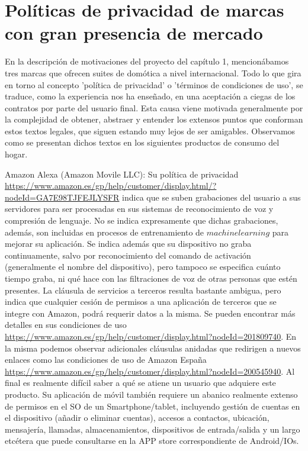 \vspace{1.5cm}


\section{Políticas de privacidad de marcas con gran presencia de mercado}
\label{ch:Capitulo2.1}

En la descripción de motivaciones del proyecto del capítulo 1, mencionábamos tres marcas que ofrecen suites de domótica a nivel internacional. Todo lo que gira en torno al concepto 'política de privacidad' o 'términos de condiciones de uso', se traduce, como la experiencia nos ha enseñado, en una aceptación a ciegas de los contratos por parte del usuario final. Esta causa viene motivada generalmente por la complejidad de obtener, abstraer y entender los extensos puntos que conforman estos textos legales, que siguen estando muy lejos de ser amigables. Observamos como se presentan dichos textos en los siguientes productos de consumo del hogar.

\vspace{1.5cm}

Amazon Alexa (Amazon Movile LLC): Su política de privacidad \url{https://www.amazon.es/gp/help/customer/display.html/?nodeId=GA7E98TJFEJLYSFR} indica que se suben grabaciones del usuario a sus servidores para ser procesadas en sus sistemas de reconocimiento de voz y compresión de lenguaje. No se indica expresamente que dichas grabaciones, además, son incluidas en procesos de entrenamiento de $machine learning$ para mejorar su aplicación. Se indica además que su dispositivo no graba continuamente, salvo por reconocimiento del comando de activación (generalmente el nombre del dispositivo), pero tampoco se especifica cuánto tiempo graba, ni qué hace con las filtraciones de voz de otras personas que estén presentes. La cláusula de servicios a terceros resulta bastante ambigua, pero indica que cualquier cesión de permisos a una aplicación de terceros que se integre con Amazon, podrá requerir datos a la misma. Se pueden encontrar más detalles en sus condiciones de uso \url{https://www.amazon.es/gp/help/customer/display.html?nodeId=201809740}. En la misma podemos observar adicionales cláusulas anidadas que redirigen a nuevos enlaces como las condiciones de uso de Amazon España \url{https://www.amazon.es/gp/help/customer/display.html?nodeId=200545940}. Al final es realmente difícil saber a qué se atiene un usuario que adquiere este producto. Su aplicación de móvil también requiere un abanico realmente extenso de permisos en el SO de un Smartphone/tablet, incluyendo gestión de cuentas en el dispositivo (añadir o eliminar cuentas), accesos a contactos, ubicación, mensajería, llamadas, almacenamientos, dispositivos de entrada/salida y un largo etcétera que puede consultarse en la APP store correspondiente de Android/IOs.

